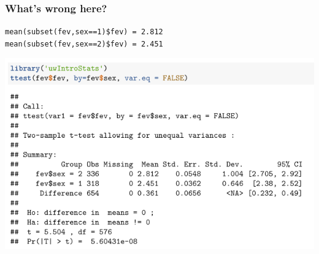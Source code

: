 \documentclass[12pt, 
hyperref={colorlinks=true, linkcolor=blue, urlcolor=cyan}]{beamer}
\begin{document}
%
%

\begin{frame}
\frametitle{What's wrong here?}

\begin{footnotesize} \texttt{mean(subset(fev,sex==1)\$fev) = 2.812}  \\ \texttt{mean(subset(fev,sex==2)\$fev) = 2.451} \end{footnotesize} \vspace{-0.3cm}

\hspace*{-0.5cm} \includegraphics[width=0.9\paperwidth]{./t-test}

\end{frame}
\end{document}
